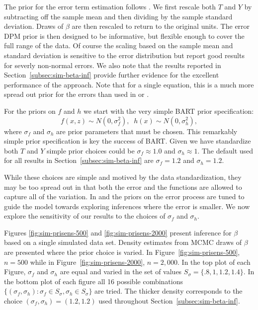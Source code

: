 The prior for the error term estimation follows \citep{CHMR08,ROSSI14}.
We first rescale both $T$ and $Y$ by subtracting off the sample mean and then
dividing by the sample standard deviation.  Draws of $\beta$ are then rescaled to return to the original units.
The error DPM prior is then designed to be informative, but flexible enough to cover the full range of the data.
Of course the scaling based on the sample mean and standard deviation is sensitive to the error distribution
but \citep{CHMR08} report good results for severly non-normal errors.
We also note that the results reported in Section~\ref{subsec:sim-beta-inf} provide further evidence
for the excellent performance of the \citep{CHMR08} approach.
Note that for a single equation, this is a much more spread out prior for the errors than used
in \citep{ChipGeor10} or \citep{DPMBART}.

For the priors on $f$ and $h$ we start with the very simple BART prior specification:
\begin{equation}
f(x,z) \sim N(0,\sigma^2_f), \;\; h(x) \sim N(0,\sigma^2_h),
\end{equation}
where $\sigma_f$ and $\sigma_h$ are prior parameters that must be chosen.
This remarkably simple prior specification is key the success of BART.
Given we have standardize both $T$ and $Y$ simple prior choices could be
$\sigma_f \approx 1.0$ and $\sigma_h \approx 1$.
The default used for all results in Section~\ref{subsec:sim-beta-inf} are 
$\sigma_f = 1.2$ and $\sigma_h = 1.2$.

While these choices are simple and motived by the data standardization, they
may be too spread out in that both the error and the functions are allowed to capture
all of the variation.  In \citep{ChipGeor10} and \citep{DPMBART} the priors on the error process
are tuned to guide the model towards exploring inferences where the error is smaller.
We now explore the sensitivity of our results to the choices of $\sigma_f$ and $\sigma_h$.

Figures \ref{fig:sim-prisens-500} and \ref{fig:sim-prisens-2000} present inference
for $\beta$ based on a single simulated data set.
Density estimates from MCMC draws of $\beta$ are presented where the prior choice is varied.
In Figure~\ref{fig:sim-prisens-500}, $n = 500$ while in Figure~\ref{fig:sim-prisens-2000}, $n = 2,000$.
In the top plot of each Figure, $\sigma_f$ and $\sigma_h$ are equal and varied in the set of values
$S_\sigma = \{.8,1,1.2,1.4\}$.
In the bottom plot of each figure all 16 possible combinations 
$\{(\sigma_f,\sigma_h): \sigma_f \in S_\sigma, \sigma_h \in S_\sigma \}$ are tried.
The thicker density  corresponds to the choice $(\sigma_f,\sigma_h) = (1.2, 1.2)$ used throughout
Section~\ref{subsec:sim-beta-inf}.

